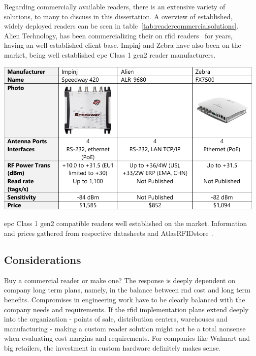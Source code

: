 Regarding commercially available readers, there is an extensive variety of solutions, to many to discuss in this dissertation. A overview of established, widely deployed readers can be seen in table~\ref{tab:readercommercialsolutions}.
Alien Technology, has been commercializing their on \ac{rfid} readers~\cite{AlienTechnologyReaders} for years, having an well established client base. Impinj and Zebra have also been on the market, being well established \ac{epc} Class 1 \ac{gen2} reader manufacturers.

\begin{table}
    \centering
    \includegraphics[width=\linewidth]{./figs/02-state-of-the-art/table_commercialreaders.pdf}
    \caption[\ac{epc} Class 1 \ac{gen2} compatible readers well established on the market]{\ac{epc} Class 1 \ac{gen2} compatible readers well established on the market. Information and prices gathered from respective datasheets and AtlasRFIDstore~\cite{AtlasRFIDstoreBuyRFID}.}
    \label{tab:readercommercialsolutions}
\end{table}

\subsection{Considerations}

Buy a commercial reader or make one?
The response is deeply dependent on company long term plans, namely, in the balance between \ac{rnd} cost and long term benefits. Compromises in engineering work have to be clearly balanced with the company needs and requirements. If the \ac{rfid} implementation plans extend deeply into the organization - points of sale, distribution centers, warehouses and manufacturing - making a custom reader solution might not be a total nonsense when evaluating cost margins and requirements. For companies like Walmart and big retailers, the investment in custom hardware definitely makes sense.

